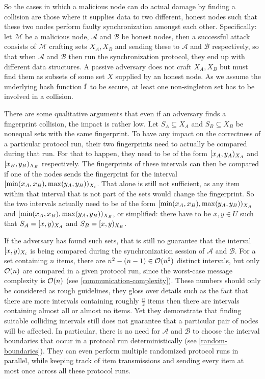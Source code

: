 So the cases in which a malicious node can do actual damage by finding a collision are those where it supplies data to two different, honest nodes such that these two nodes perform faulty synchronization amongst each other. Specifically: let $\mathcal{M}$ be a malicious node, $\mathcal{A}$ and $\mathcal{B}$ be honest nodes, then a successful attack consists of $\mathcal{M}$ crafting sets $X_A, X_B$ and sending these to $\mathcal{A}$ and $\mathcal{B}$ respectively, so that when $\mathcal{A}$ and $\mathcal{B}$ then run the synchronization protocol, they end up with different data structures. A passive adversary does not craft $X_A, X_B$ but must find them as subsets of some set $X$ supplied by an honest node. As we assume the underlying hash function $\operatorname{f}$ to be secure, at least one non-singleton set has to be involved in a collision.

There are some qualitative arguments that even if an adversary finds a fingerprint collision, the impact is rather low. Let $S_A \subseteq X_A$ and $S_B \subseteq X_B$ be nonequal sets with the same fingerprint. To have any impact on the correctness of a particular protocol run, their two fingerprints need to actually be compared during that run. For that to happen, they need to be of the form $[{x_A},{y_A})_{X_A}$ and $[{x_B},{y_B})_{X_B}$ respectively. The fingerprints of these intervals can then be compared if one of the nodes sends the fingerprint for the interval $[{\min(x_A, x_B)},{\max(y_A, y_B)})_{X_i}$. That alone is still not sufficient, as any item within that interval that is not part of the sets would change the fingerprint. So the two intervals actually need to be of the form $[{\min(x_A, x_B)},{\max(y_A, y_B)})_{X_A}$ and $[{\min(x_A, x_B)},{\max(y_A, y_B)})_{X_B}$, or simplified: there have to be $x, y \in U$ such that $S_A = [{x},{y})_{X_A}$ and $S_B = [{x},{y})_{X_B}$.

If the adversary has found such sets, that is still no guarantee that the interval $[{x},{y})_{X_i}$ is being compared during the synchronization session of $\mathcal{A}$ and $\mathcal{B}$. For a set containing $n$ items, there are $n^2 - (n - 1) \in \mathcal{O}(n^2)$ distinct intervals, but only $\mathcal{O}(n)$ are compared in a given protocol run, since the worst-case message complexity is $\mathcal{O}(n)$ (see \cref{communication-complexity}). These numbers should only be considered as rough guidelines, they gloss over details such as the fact that there are more intervals containing roughly $\frac{n}{2}$ items then there are intervals containing almost all or almost no items. Yet they demonstrate that finding suitable colliding intervals still does not guarantee that a particular pair of nodes will be affected. In particular, there is no need for $\mathcal{A}$ and $\mathcal{B}$ to choose the interval boundaries that occur in a protocol run deterministically (see \cref{random-boundaries}). They can even perform multiple randomized protocol runs in parallel, while keeping track of item transmissions and sending every item at most once across all these protocol runs.

